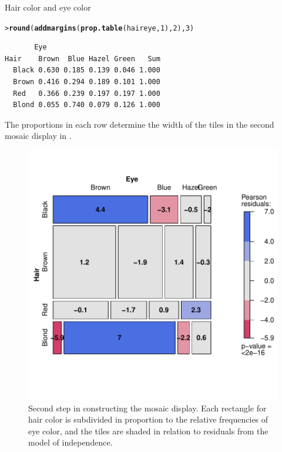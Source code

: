 \documentclass[10pt,krantz2]{krantz}\usepackage[]{graphicx}\usepackage[]{color}
\makeatletter
\newcommand{\hlnum}[1]{\textcolor[rgb]{0.686,0.059,0.569}{#1}}%
\newcommand{\hlstd}[1]{\textcolor[rgb]{0.345,0.345,0.345}{#1}}%
\newcommand{\hlkwd}[1]{\textcolor[rgb]{0.737,0.353,0.396}{\textbf{#1}}}%
\newenvironment{kframe}{%
 \def\at@end@of@kframe{}%
 \ifinner\ifhmode%
  \def\at@end@of@kframe{\end{minipage}}%
  \begin{minipage}{\columnwidth}%
 \fi\fi%
 \def\FrameCommand##1{\hskip\@totalleftmargin \hskip-\fboxsep
 \colorbox{shadecolor}{##1}\hskip-\fboxsep
     \hskip-\linewidth \hskip-\@totalleftmargin \hskip\columnwidth}%
 \MakeFramed {\advance\hsize-\width
   \@totalleftmargin\z@ \linewidth\hsize
   \@setminipage}}%
 {\par\unskip\endMakeFramed%
 \at@end@of@kframe}
\newenvironment{knitrout}{}{} %
\renewenvironment{knitrout}{\small\renewcommand{\baselinestretch}{.85}}{} %
\makeatother
\begin{document}
\begin{Example}[haireye2a]{Hair color and eye color}
\begin{knitrout}
\color{fgcolor}\begin{kframe}
\begin{alltt}
\hlstd{> }\hlkwd{round}\hlstd{(}\hlkwd{addmargins}\hlstd{(}\hlkwd{prop.table}\hlstd{(haireye,} \hlnum{1}\hlstd{),} \hlnum{2}\hlstd{),} \hlnum{3}\hlstd{)}
\end{alltt}
\begin{verbatim}
       Eye
Hair    Brown  Blue Hazel Green   Sum
  Black 0.630 0.185 0.139 0.046 1.000
  Brown 0.416 0.294 0.189 0.101 1.000
  Red   0.366 0.239 0.197 0.197 1.000
  Blond 0.055 0.740 0.079 0.126 1.000
\end{verbatim}
\end{kframe}
\end{knitrout}
The proportions in each row determine the width of the tiles in the second mosaic display in .

\begin{knitrout}
\color{fgcolor}\begin{figure}[!htbp]

\centerline{\includegraphics[width=.6\textwidth]{ch05/fig/haireye-mos8-1} }

\caption[Second step in constructing the mosaic display]{Second step in constructing the mosaic display.  Each rectangle for hair color is subdivided in proportion to the relative frequencies of eye color, and the tiles are shaded in relation to residuals from the model of independence.\label{fig:haireye-mos8}}
\end{figure}


\end{knitrout}


\end{Example}
\end{document}
